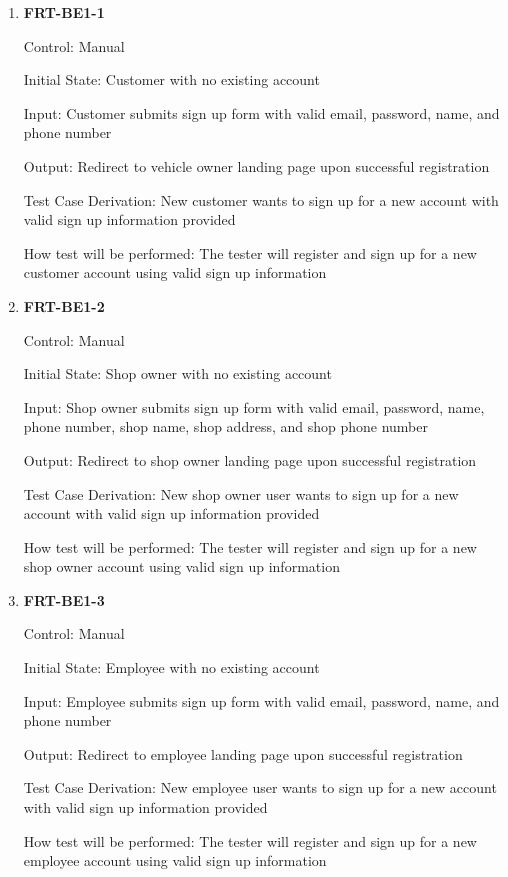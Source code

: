 \documentclass[12pt, titlepage]{article}
\begin{document}
\begin{enumerate}

	\item \textbf{FRT-BE1-1}

	      Control: Manual

	      Initial State: Customer with no existing account

	      Input: Customer submits sign up form with valid email, password, name, and phone number

	      Output: Redirect to vehicle owner landing page upon successful registration

	      Test Case Derivation: New customer wants to sign up for a new account with valid sign up
	      information provided

	      How test will be performed: The tester will register and sign up for a new customer account using
	      valid sign up information

	\item \textbf{FRT-BE1-2}

	      Control: Manual

	      Initial State: Shop owner with no existing account

	      Input: Shop owner submits sign up form with valid email, password, name, phone number, shop name,
	      shop address, and shop phone number

	      Output: Redirect to shop owner landing page upon successful registration

	      Test Case Derivation: New shop owner user wants to sign up for a new account with valid sign up
	      information provided

	      How test will be performed: The tester will register and sign up for a new shop owner account using
	      valid sign up information

	\item \textbf{FRT-BE1-3}

	      Control: Manual

	      Initial State: Employee with no existing account

	      Input: Employee submits sign up form with valid email, password, name, and phone number

	      Output: Redirect to employee landing page upon successful registration

	      Test Case Derivation: New employee user wants to sign up for a new account with valid sign up
	      information provided

	      How test will be performed: The tester will register and sign up for a new employee account using
	      valid sign up information


\end{enumerate}
\end{document}

